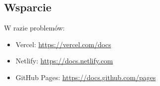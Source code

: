 \documentclass[12pt,a4paper]{article}
\begin{document}
\subsection{Wsparcie}
W razie problemów:
\begin{itemize}
    \item Vercel: \url{https://vercel.com/docs}
    \item Netlify: \url{https://docs.netlify.com}
    \item GitHub Pages: \url{https://docs.github.com/pages}
\end{itemize}
\end{document}
